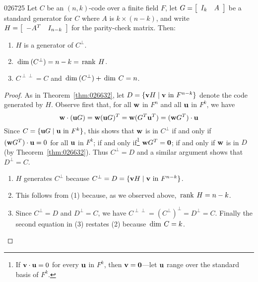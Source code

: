 \begin{theorem}{}{026725}
Let $C$ be an $(n, k)$-code over a finite field $F$, let $G = \left[ \begin{array}{cc}
I_k & A
\end{array} \right]$ be a standard generator for $C$ where $A$ is $k \times (n -
k)$, and write $H = \left[ \begin{array}{cc}
-A^{T} & I_{n - k}
\end{array} \right]$ for the parity-check matrix. Then:

\begin{enumerate}
\item $H$ is a generator of $C^{\perp}$.

\item $\thinspace\operatorname{dim\medspace}(C^{\perp}) = n - k = \thinspace\operatorname{rank\medspace} H$.

\item $C^{\perp\perp} = C$ and $\thinspace\operatorname{dim\medspace}(C^{\perp}) + \thinspace\operatorname{dim\medspace} C = n$.

\end{enumerate}
\end{theorem}

\begin{proof}
As in Theorem~\ref{thm:026632}, let $D = \{\textbf{v}H \mid \textbf{v} \mbox{ in } F^{n - k}\}$ denote the code generated by $H$. Observe first that, for all $\textbf{w}$ in $F^{n}$ and all $\textbf{u}$ in $F^{k}$, we have
\begin{equation*}
\textbf{w} \cdot (\textbf{u}G) = \textbf{w}(\textbf{u}G)^T= \textbf{w}(G^T\textbf{u}^T) = (\textbf{w}G^T) \cdot \textbf{u}
\end{equation*}
Since $C = \{\textbf{u}G \mid \textbf{u} \mbox{ in } F^{k}\}$, this shows that $\textbf{w}$ is in $C^{\perp}$ if and only if $(\textbf{w}G^{T}) \cdot \textbf{u} = 0$ for all $\textbf{u}$ in $F^{k}$; if and only if\footnote{If $\textbf{v} \cdot \textbf{u} = 0$ for every $\textbf{u}$ in $F^{k}$, then $\textbf{v} = \textbf{0}$---let $\textbf{u}$ range over the standard basis of $F^{k}$.} $\textbf{w}G^{T} = \textbf{0}$; if and only if $\textbf{w}$ is in $D$ (by Theorem~\ref{thm:026632}). Thus $C^{\perp} = D$ and a similar argument shows that $D^{\perp} = C$.

\begin{enumerate}
\item $H$ generates $C^{\perp}$ because $C^{\perp} = D = \{\textbf{v}H \mid \textbf{v} \mbox{ in } F^{n - k} \}$.

\item This follows from (1) because, as we observed above, $\thinspace\operatorname{rank\medspace} H = n - k$.

\item Since $C^{\perp} = D$ and $D^{\perp} = C$, we have $C^{\perp\perp} = (C^{\perp})^{\perp} = D^{\perp} = C$. Finally the second equation in (3) restates (2) because $\thinspace\operatorname{dim\medspace} C = k$.
\end{enumerate}
\vspace*{-2em}\end{proof}

